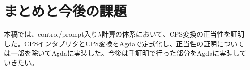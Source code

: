 \section{まとめと今後の課題}
本稿では、control/prompt入り$\lambda$計算の体系において、CPS変換の正当性を証明した。CPSインタプリタとCPS変換をAgdaで定式化し、正当性の証明については一部を除いてAgdaに実装した。今後は手証明で行った部分をAgdaに実装していきたい。

